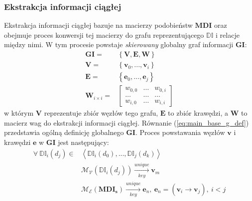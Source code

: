 \subsubsection{Ekstrakcja informacji ciągłej}
Ekstrakcja informacji ciągłej bazuje na macierzy podobieństw $\mathbf{MDI}$ oraz obejmuje proces
konwersji tej macierzy do grafu reprezentującego $ \mathbb{DI}$ i relacje między nimi. W tym procesie
powstaje \textit{skierowany} globalny graf informacji $\mathbf{GI}$:
\begin{equation} 
    \label{eq:main_base_g_def}
    \begin{aligned}
        \mathbf{GI} = &
            \left\{
                \mathbf{V}, \mathbf{E}, \mathbf{W}
            \right\}
        \\
        \mathbf{V} = &
            \left\{ \mathbf{v}_{0}, ..., \mathbf{v}_{i} \right\}
        \\
        \mathbf{E} = &
            \left\{ \mathbf{e}_{0}, ..., \mathbf{e}_{j} \right\}
        \\
        \mathbf{W}_{i \times i} = &
            \left[ 
                \begin{array}{ccc}
                    w_{0, 0} & \dots & w_{0, i} 
                    \\
                    \dots & \dots & \dots 
                    \\
                    w_{i, 0} & \dots & w_{i, i}
                \end{array}
            \right]
    \end{aligned}
\end{equation}
w którym $\mathbf{V}$ reprezentuje zbiór węzłów tego grafu, $\mathbf{E}$ to zbiór krawędzi,
a $\mathbf{W}$ to macierz wag do ekstrakcji informacji ciągłej. 
Równanie (\ref{eq:main_base_g_def}) przedstawia ogólną definicję globalnego $\mathbf{GI}$. 
Proces powstawania węzłów $\mathbf{v}$ i krawędzi $\mathbf{e}$ w $\mathbf{GI}$ jest następujący:
\begin{equation}
    \label{eq:func_map_v_e_to_g}
    \begin{aligned}
        \forall \: \mathbb{DI}_{i}(d_{j}) \in &
        \left<
            \mathbb{DI}_{i}(d_0), ..., \mathbb{DI}_{j}(d_k)
        \right> 
        \\
        & \mathcal{M_{V}}(\mathbb{DI}_{i}(d_{j})) 
            \xrightarrow[key]{unique} 
                \mathbf{v}_{m} 
        \\
        & \mathcal{M_{E}}(\mathbf{MDI_s}) 
            \xrightarrow[key]{unique} 
                \mathbf{e}_{n}, 
            \: 
                \mathbf{e}_{n} = (\mathbf{v}_{i} \xrightarrow[]{} \mathbf{v}_{j}), \: i < j
    \end{aligned}
\end{equation}
